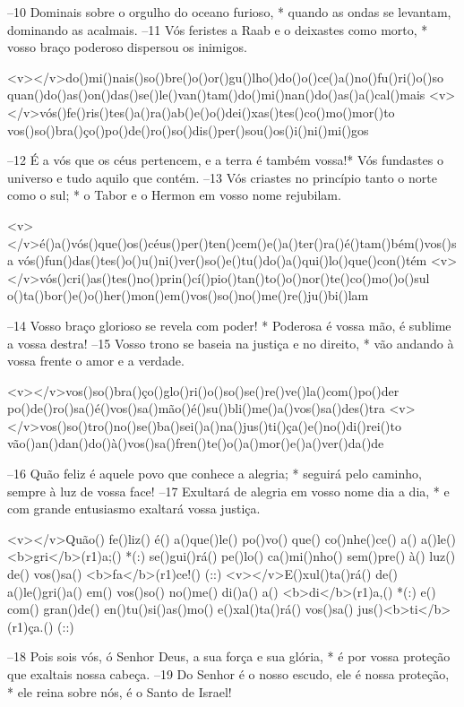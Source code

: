 –10 Dominais sobre o orgulho do oceano furioso, *
quando as ondas se levantam, dominando as acalmais. 
–11 Vós feristes a Raab e o deixastes como morto, *
vosso braço poderoso dispersou os inimigos.

<v></v>do()mi()nais()so()bre()o()or()gu()lho()do()o()ce()a()no()fu()ri()o()so
quan()do()as()on()das()se()le()van()tam()do()mi()nan()do()as()a()cal()mais
<v></v>vós()fe()ris()tes()a()ra()ab()e()o()dei()xas()tes()co()mo()mor()to
vos()so()bra()ço()po()de()ro()so()dis()per()sou()os()i()ni()mi()gos

–12 É a vós que os céus pertencem, e a terra é também vossa!*
Vós fundastes o universo e tudo aquilo que contém. 
–13 Vós criastes no princípio tanto o norte como o sul; *
o Tabor e o Hermon em vosso nome rejubilam.

<v></v>é()a()vós()que()os()céus()per()ten()cem()e()a()ter()ra()é()tam()bém()vos()sa
vós()fun()das()tes()o()u()ni()ver()so()e()tu()do()a()qui()lo()que()con()tém
<v></v>vós()cri()as()tes()no()prin()cí()pio()tan()to()o()nor()te()co()mo()o()sul
o()ta()bor()e()o()her()mon()em()vos()so()no()me()re()ju()bi()lam

–14 Vosso braço glorioso se revela com poder! *
Poderosa é vossa mão, é sublime a vossa destra! 
–15 Vosso trono se baseia na justiça e no direito, *
vão andando à vossa frente o amor e a verdade.

<v></v>vos()so()bra()ço()glo()ri()o()so()se()re()ve()la()com()po()der
po()de()ro()sa()é()vos()sa()mão()é()su()bli()me()a()vos()sa()des()tra
<v></v>vos()so()tro()no()se()ba()sei()a()na()jus()ti()ça()e()no()di()rei()to
vão()an()dan()do()à()vos()sa()fren()te()o()a()mor()e()a()ver()da()de

–16 Quão feliz é aquele povo que conhece a alegria; *
seguirá pelo caminho, sempre à luz de vossa face! 
–17 Exultará de alegria em vosso nome dia a dia, *
e com grande entusiasmo exaltará vossa justiça.

<v></v>Quão() fe()liz() é() a()que()le() po()vo() que() co()nhe()ce() a() a()le()<b>gri</b>(r1)a;() *(:)
se()gui()rá() pe()lo() ca()mi()nho() sem()pre() à() luz() de() vos()sa() <b>fa</b>(r1)ce!() (::)
<v></v>E()xul()ta()rá() de() a()le()gri()a() em() vos()so() no()me() di()a() a() <b>di</b>(r1)a,() *(:)
e() com() gran()de() en()tu()si()as()mo() e()xal()ta()rá() vos()sa() jus()<b>ti</b>(r1)ça.() (::)

–18 Pois sois vós, ó Senhor Deus, a sua força e sua glória, *
é por vossa proteção que exaltais nossa cabeça. 
–19 Do Senhor é o nosso escudo, ele é nossa proteção, *
ele reina sobre nós, é o Santo de Israel!

